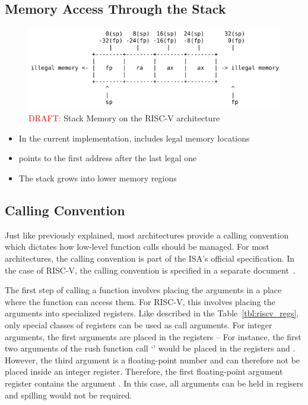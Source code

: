 \subsection{Memory Access Through the Stack}

\begin{figure}[h]
	\includegraphics[width=\textwidth]{./riscv_stack_draft.png}
	\caption{\textcolor{red}{DRAFT:} Stack Memory on the RISC-V architecture}\label{fig:riscv_stack}
\end{figure}

\begin{itemize}
	\item In the current implementation,  includes legal memory locations
	\item {} points to the first address after the last legal one
    \item The stack grows into lower memory regions
\end{itemize}

\subsection{Calling Convention}

Just like previously explained, most architectures provide a calling convention which dictates how low-level function calls should be managed.
For most architectures, the calling convention is part of the ISA's official specification.
In the case of RISC-V, the calling convention is specified in a separate document~\cite{RiscvABI}.

The first step of calling a function involves placing the arguments in a place where the function can access them.
For RISC-V, this involves placing the arguments into specialized registers.
Like described in the Table~\ref{tbl:riscv_regs}, only special classes of registers can be used as call arguments.
For integer arguments, the first arguments are placed in the registers --
For instance, the first two arguments of the rush function call `' would be placed in the registers  and .
However, the third argument is a floating-point number and can therefore not be placed inside an integer register.
Therefore, the first floating-point argument register  contains the argument .
In this case, all arguments can be held in regisers and spilling would not be required.

